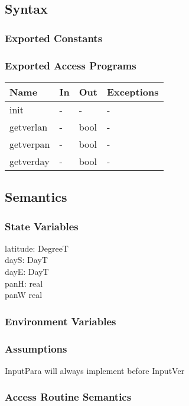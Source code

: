 \documentclass[12pt, titlepage]{article}
\begin{document}
\subsection{Syntax}

\subsubsection{Exported Constants}


\subsubsection{Exported Access Programs}

\begin{center}
\begin{tabular}{p{2cm} p{4cm} p{4cm} p{2cm}}
\hline
\textbf{Name} & \textbf{In} & \textbf{Out} & \textbf{Exceptions} \\
\hline 
init & - & - & - \\
getverlan & - & bool & - \\
getverpan & - & bool & - \\
getverday & - & bool & - \\
\hline
\end{tabular}
\end{center}


\subsection{Semantics}

\subsubsection{State Variables}
latitude: DegreeT\\
dayS: DayT\\
dayE: DayT\\
panH: real\\
panW real


\subsubsection{Environment Variables}


\subsubsection{Assumptions}
InputPara will always implement before InputVer


\subsubsection{ Access Routine Semantics}
\end{document}
